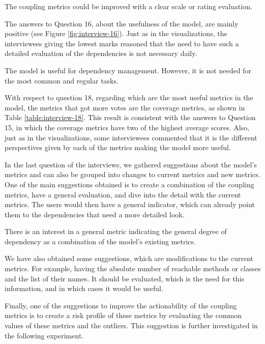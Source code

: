 \begin{finding}
	The coupling metrics could be improved with a clear scale or rating evaluation.
	\label{find:coupling-scale}
\end{finding}

The answers to Question 16, about the usefulness of the model, are mainly positive (see Figure \ref{fig:interview-16}). Just as in the visualizations, the interviewees giving the lowest marks reasoned that the need to have such a detailed evaluation of the dependencies is not necessary daily.

\begin{finding}
	The model is useful for dependency management. However, it is not needed for the most common and regular tasks.
	\label{find:model-useful}
\end{finding}

With respect to question 18, regarding which are the most useful metrics in the model, the metrics that got more votes are the coverage metrics, as shown in Table \ref{table:interview-18}. This result is consistent with the answers to Question 15, in which the coverage metrics have two of the highest average scores. Also, just as in the visualizations, some interviewees commented that it is the different perspectives given by each of the metrics making the model more useful.

In the last question of the interviews, we gathered suggestions about the model's metrics and can also be grouped into changes to current metrics and new metrics. One of the main suggestions obtained is to create a combination of the coupling metrics, have a general evaluation, and dive into the detail with the current metrics. The users would then have a general indicator, which can already point them to the dependencies that need a more detailed look.

\begin{finding}
	There is an interest in a general metric indicating the general degree of dependency as a combination of the model's existing metrics.
	\label{find:general-metric}
\end{finding}

We have also obtained some suggestions, which are modifications to the current metrics. For example, having the absolute number of reachable methods or classes and the list of their names. It should be evaluated, which is the need for this information, and in which cases it would be useful.

Finally, one of the suggestions to improve the actionability of the coupling metrics is to create a risk profile of these metrics by evaluating the common values of these metrics and the outliers. This suggestion is further investigated in the following experiment.

